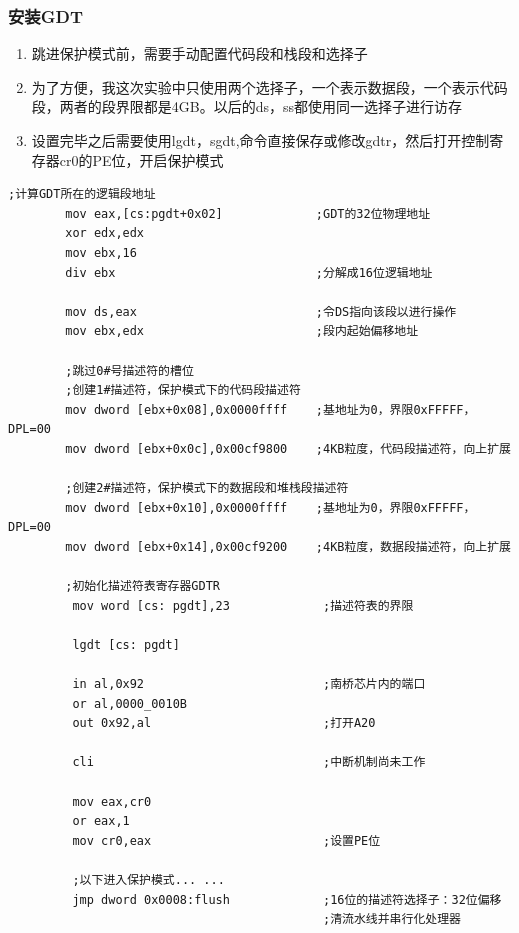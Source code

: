 \documentclass[a4paper,11pt,UTF8]{ctexart}
\begin{document}
			
		\subsubsection{安装GDT}
			\begin{enumerate}
				\item 跳进保护模式前，需要手动配置代码段和栈段和选择子
				\item 为了方便，我这次实验中只使用两个选择子，一个表示数据段，一个表示代码段，两者的段界限都是4GB。以后的ds，ss都使用同一选择子进行访存
				\item 设置完毕之后需要使用lgdt，sgdt,命令直接保存或修改gdtr，然后打开控制寄存器cr0的PE位，开启保护模式
			\end{enumerate}
			
	\begin{lstlisting}[caption={安装 gdt},tabsize=4,basicstyle=\footnotesize,captionpos=b]
		;计算GDT所在的逻辑段地址
		mov eax,[cs:pgdt+0x02]             ;GDT的32位物理地址 
		xor edx,edx
		mov ebx,16
		div ebx                            ;分解成16位逻辑地址 

		mov ds,eax                         ;令DS指向该段以进行操作
		mov ebx,edx                        ;段内起始偏移地址 

		;跳过0#号描述符的槽位 
		;创建1#描述符，保护模式下的代码段描述符
		mov dword [ebx+0x08],0x0000ffff    ;基地址为0，界限0xFFFFF，DPL=00 
		mov dword [ebx+0x0c],0x00cf9800    ;4KB粒度，代码段描述符，向上扩展 

		;创建2#描述符，保护模式下的数据段和堆栈段描述符 
		mov dword [ebx+0x10],0x0000ffff    ;基地址为0，界限0xFFFFF，DPL=00
		mov dword [ebx+0x14],0x00cf9200    ;4KB粒度，数据段描述符，向上扩展 

		;初始化描述符表寄存器GDTR
         mov word [cs: pgdt],23             ;描述符表的界限   
 
         lgdt [cs: pgdt]
      
         in al,0x92                         ;南桥芯片内的端口 
         or al,0000_0010B
         out 0x92,al                        ;打开A20

         cli                                ;中断机制尚未工作

         mov eax,cr0                  
         or eax,1
         mov cr0,eax                        ;设置PE位
      
         ;以下进入保护模式... ...
         jmp dword 0x0008:flush             ;16位的描述符选择子：32位偏移
                                            ;清流水线并串行化处理器
	\end{lstlisting}
\end{document}
